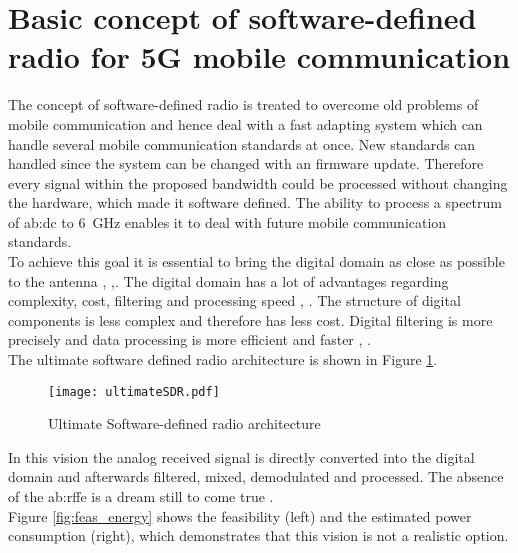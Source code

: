 \section{Basic concept of software-defined radio for 5G mobile communication}
The concept of software-defined radio is treated to overcome old problems of mobile communication and hence deal with a fast adapting system which can handle several mobile communication standards at once. %
New standards can handled since the system can be changed with an firmware update. 
Therefore every signal within the proposed bandwidth could be processed without changing the hardware, which made it software defined.
The ability to process a spectrum of \gls{ab:dc} to \SI{6}{\giga \hertz} enables it to deal with future mobile communication standards.\\
To achieve this goal it is essential to bring the digital domain as close as possible to the antenna \cite{RivetDevalBegueretJ.-B.2007}, \cite{DevalRivetVeyracEtAl2013},\cite{RivetDevalJ.-B.EtAl2010}.
The digital domain has a lot of advantages regarding complexity, cost, filtering and processing speed \cite{Grossman2005}, \cite{Maroldt2010}.
The structure of digital components is less complex and therefore has less cost.
Digital filtering is more precisely and data processing is more efficient and faster \cite{Chamberlain2015}, \cite{LiRaghunathanJha2009}.\\
The ultimate software defined radio architecture is shown in Figure \ref{fig:ultimateSDR}.

\begin{figure}[ht]
	\centering
  \texttt{[image: ultimateSDR.pdf]}
	\caption{Ultimate Software-defined radio architecture \cite{DevalRivetVeyracEtAl2013}}
	\label{fig:ultimateSDR}
\end{figure}

In this vision the analog received signal is directly converted into the digital domain and afterwards filtered, mixed, demodulated and processed.
The absence of the \gls{ab:rffe} is a dream still to come true \cite{RivetDevalJ.-B.EtAl2010}.\\
Figure \ref{fig:feas_energy} shows the feasibility (left) and the estimated power consumption (right), which demonstrates that this vision is not a realistic option.

